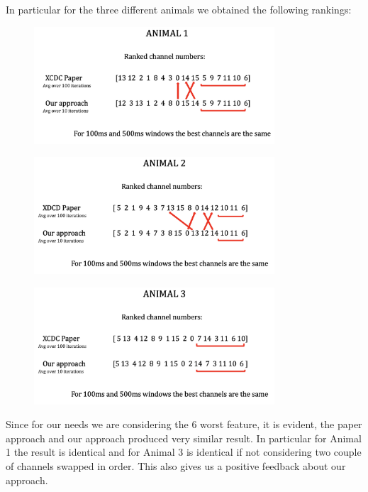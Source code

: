 \documentclass{Configuration_Files/PoliMi3i_thesis}
\begin{document}
In particular for the three different animals we obtained the following rankings:

\begin{figure}[H]
    \centering
    \includegraphics[width=0.8\textwidth]{Results Matteo/Screenshot 2024-08-18 at 18.54.22.png}
\end{figure}

\begin{figure}[H]
    \centering
    \includegraphics[width=0.8\textwidth]{Results Matteo/Screenshot 2024-08-18 at 18.54.28.png}
\end{figure}

\begin{figure}[H]
    \centering
    \includegraphics[width=0.8\textwidth]{Results Matteo/Screenshot 2024-08-18 at 18.54.30.png}
\end{figure}

Since for our needs we are considering the 6 worst feature, it is evident, the paper approach and our approach produced very similar result.
In particular for Animal 1 the result is identical and for Animal 3 is identical if not considering two couple of channels swapped in order.
This also gives us a positive feedback about our approach.
\end{document}
